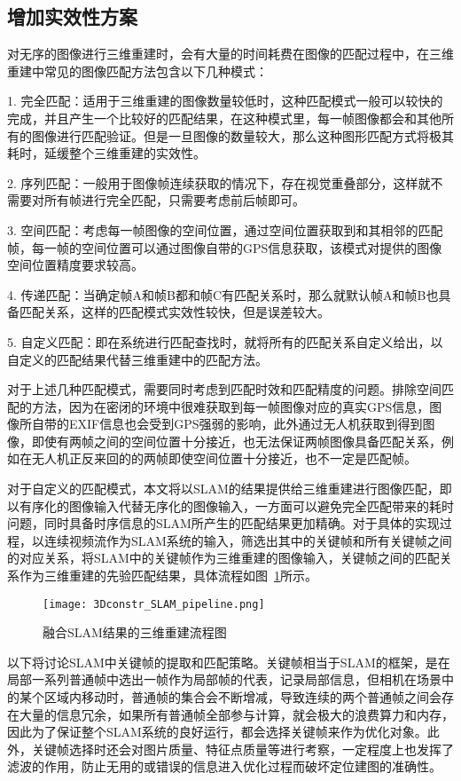 \subsection{增加实效性方案}
\label{sec:3.3.2}对无序的图像进行三维重建时，会有大量的时间耗费在图像的匹配过程中，在三维重建中常见的图像匹配方法包含以下几种模式：

1. 完全匹配：适用于三维重建的图像数量较低时，这种匹配模式一般可以较快的完成，并且产生一个比较好的匹配结果，在这种模式里，每一帧图像都会和其他所有的图像进行匹配验证。但是一旦图像的数量较大，那么这种图形匹配方式将极其耗时，延缓整个三维重建的实效性。

2. 序列匹配：一般用于图像帧连续获取的情况下，存在视觉重叠部分，这样就不需要对所有帧进行完全匹配，只需要考虑前后帧即可。

3. 空间匹配：考虑每一帧图像的空间位置，通过空间位置获取到和其相邻的匹配帧，每一帧的空间位置可以通过图像自带的GPS信息获取，该模式对提供的图像空间位置精度要求较高。

4. 传递匹配：当确定帧A和帧B都和帧C有匹配关系时，那么就默认帧A和帧B也具备匹配关系，这样的匹配模式实效性较快，但是误差较大。

5. 自定义匹配：即在系统进行匹配查找时，就将所有的匹配关系自定义给出，以自定义的匹配结果代替三维重建中的匹配方法。

对于上述几种匹配模式，需要同时考虑到匹配时效和匹配精度的问题。排除空间匹配的方法，因为在密闭的环境中很难获取到每一帧图像对应的真实GPS信息，图像所自带的EXIF信息也会受到GPS强弱的影响，此外通过无人机获取到得到图像，即使有两帧之间的空间位置十分接近，也无法保证两帧图像具备匹配关系，例如在无人机正反来回的的两帧即使空间位置十分接近，也不一定是匹配帧。

对于自定义的匹配模式，本文将以SLAM的结果提供给三维重建进行图像匹配，即以有序化的图像输入代替无序化的图像输入，一方面可以避免完全匹配带来的耗时问题，同时具备时序信息的SLAM所产生的匹配结果更加精确。对于具体的实现过程，以连续视频流作为SLAM系统的输入，筛选出其中的关键帧和所有关键帧之间的对应关系，将SLAM中的关键帧作为三维重建的图像输入，关键帧之间的匹配关系作为三维重建的先验匹配结果，具体流程如图~\ref{fig:3Dconstr_SLAM_pipeline}所示。
\begin{figure}[t] %
  \centering
  \texttt{[image: 3Dconstr\_SLAM\_pipeline.png]}
  \caption{融合SLAM结果的三维重建流程图}
  \label{fig:3Dconstr_SLAM_pipeline}
\end{figure}
以下将讨论SLAM中关键帧的提取和匹配策略。关键帧相当于SLAM的框架，是在局部一系列普通帧中选出一帧作为局部帧的代表，记录局部信息，但相机在场景中的某个区域内移动时，普通帧的集合会不断增减，导致连续的两个普通帧之间会存在大量的信息冗余，如果所有普通帧全部参与计算，就会极大的浪费算力和内存， 因此为了保证整个SLAM系统的良好运行，都会选择关键帧来作为优化对象。此外，关键帧选择时还会对图片质量、特征点质量等进行考察，一定程度上也发挥了滤波的作用，防止无用的或错误的信息进入优化过程而破坏定位建图的准确性。

